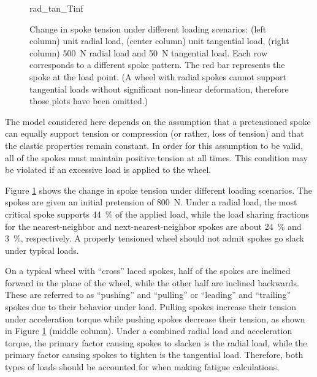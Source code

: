 \documentclass[\rootdir/thesis.tex]{subfiles}
\begin{document}
\begin{figure}
\centering
{rad_tan_Tinf}
\caption{Change in spoke tension under different loading scenarios: (left column) unit radial load, (center column) unit tangential load, (right column) \SI{500}{N} radial load and \SI{50}{N} tangential load. Each row corresponds to a different spoke pattern. The red bar represents the spoke at the load point. (A wheel with radial spokes cannot support tangential loads without significant non-linear deformation, therefore those plots have been omitted.)}
\label{fig:radtan_Tinf}
\end{figure}

The model considered here depends on the assumption that a pretensioned spoke can equally support tension or compression (or rather, loss of tension) and that the elastic properties remain constant. In order for this assumption to be valid, all of the spokes must maintain positive tension at all times. This condition may be violated if an excessive load is applied to the wheel.

Figure \ref{fig:radtan_Tinf} shows the change in spoke tension under different loading scenarios. The spokes are given an initial pretension of \SI{800}{N}. Under a radial load, the most critical spoke supports \SI{44}{\percent} of the applied load, while the load sharing fractions for the nearest-neighbor and next-nearest-neighbor spokes are about \SI{24}{\percent} and \SI{3}{\percent}, respectively. A properly tensioned wheel should not admit spokes go slack under typical loads.

On a typical wheel with ``cross'' laced spokes, half of the spokes are inclined forward in the plane of the wheel, while the other half are inclined backwards. These are referred to as ``pushing'' and ``pulling'' or ``leading'' and ``trailing'' spokes due to their behavior under load. Pulling spokes increase their tension under acceleration torque while pushing spokes decrease their tension, as shown in Figure \ref{fig:radtan_Tinf} (middle column). Under a combined radial load and acceleration torque, the primary factor causing spokes to slacken is the radial load, while the primary factor causing spokes to tighten is the tangential load. Therefore, both types of loads should be accounted for when making fatigue calculations.
\end{document}

